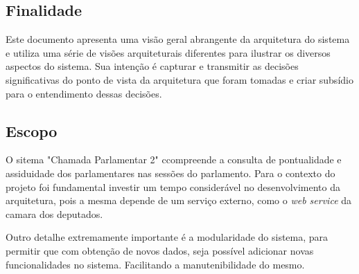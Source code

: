 \subsection{Finalidade}

Este documento apresenta uma visão geral abrangente da arquitetura do sistema e utiliza uma série de visões arquiteturais diferentes para ilustrar os diversos aspectos do sistema. Sua intenção é capturar e transmitir as decisões significativas do ponto de vista da arquitetura que foram tomadas e criar subsídio para o entendimento dessas decisões.

\subsection{Escopo}

O sitema "Chamada Parlamentar 2" ccompreende a consulta de pontualidade e assiduidade dos parlamentares nas sessões do parlamento. Para o contexto do projeto foi fundamental investir um tempo considerável no desenvolvimento da arquitetura, pois a mesma depende de um serviço externo, como o \textit{web service} da camara dos deputados. 

Outro detalhe extremamente importante é a modularidade do sistema, para permitir que com obtenção de novos dados, seja possível adicionar novas funcionalidades no sistema. Facilitando a manutenibilidade do mesmo.